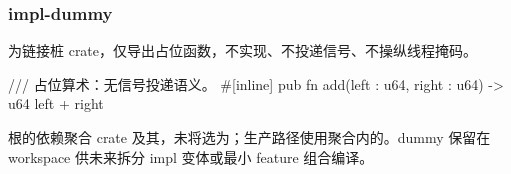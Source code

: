 
\subsubsection{impl-dummy}

为链接桩 crate，仅导出占位函数，不实现、不投递信号、不操纵线程掩码。

\begin{rustcode}
/// 占位算术：无信号投递语义。
#[inline]
pub fn add(left : u64, right : u64) -> u64 { left + right }
\end{rustcode}

根的依赖聚合 crate 及其，未将选为；生产路径使用聚合内的。dummy 保留在 workspace 供未来拆分 impl 变体或最小 feature 组合编译。
